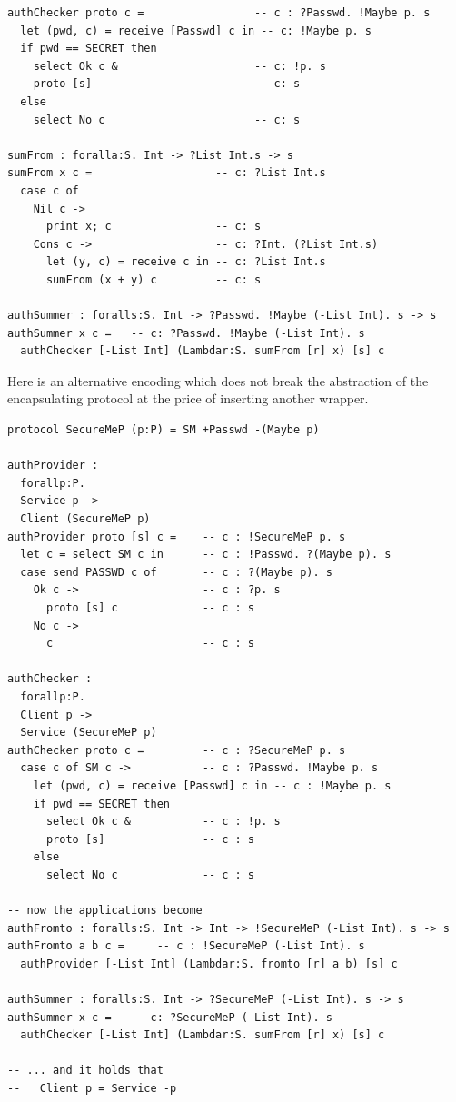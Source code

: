 \begin{lstlisting}
authChecker proto c =                 -- c : ?Passwd. !Maybe p. s
  let (pwd, c) = receive [Passwd] c in -- c: !Maybe p. s
  if pwd == SECRET then
    select Ok c &                     -- c: !p. s
    proto [s]                         -- c: s
  else
    select No c                       -- c: s

sumFrom : foralla:S. Int -> ?List Int.s -> s
sumFrom x c =                   -- c: ?List Int.s
  case c of
    Nil c ->                    
      print x; c                -- c: s
    Cons c ->                   -- c: ?Int. (?List Int.s)
      let (y, c) = receive c in -- c: ?List Int.s
      sumFrom (x + y) c         -- c: s

authSummer : foralls:S. Int -> ?Passwd. !Maybe (-List Int). s -> s
authSummer x c =   -- c: ?Passwd. !Maybe (-List Int). s
  authChecker [-List Int] (Lambdar:S. sumFrom [r] x) [s] c
\end{lstlisting}

Here is an alternative encoding which does not break the abstraction
of the encapsulating protocol at the price of inserting another wrapper.
\begin{lstlisting}
protocol SecureMeP (p:P) = SM +Passwd -(Maybe p)

authProvider : 
  forallp:P.
  Service p ->
  Client (SecureMeP p)
authProvider proto [s] c =    -- c : !SecureMeP p. s
  let c = select SM c in      -- c : !Passwd. ?(Maybe p). s
  case send PASSWD c of       -- c : ?(Maybe p). s
    Ok c ->                   -- c : ?p. s
      proto [s] c             -- c : s
    No c ->
      c                       -- c : s

authChecker :
  forallp:P.
  Client p ->
  Service (SecureMeP p)
authChecker proto c =         -- c : ?SecureMeP p. s
  case c of SM c ->           -- c : ?Passwd. !Maybe p. s
    let (pwd, c) = receive [Passwd] c in -- c : !Maybe p. s
    if pwd == SECRET then
      select Ok c &           -- c : !p. s
      proto [s]               -- c : s
    else
      select No c             -- c : s

-- now the applications become
authFromto : foralls:S. Int -> Int -> !SecureMeP (-List Int). s -> s
authFromto a b c =     -- c : !SecureMeP (-List Int). s
  authProvider [-List Int] (Lambdar:S. fromto [r] a b) [s] c

authSummer : foralls:S. Int -> ?SecureMeP (-List Int). s -> s
authSummer x c =   -- c: ?SecureMeP (-List Int). s
  authChecker [-List Int] (Lambdar:S. sumFrom [r] x) [s] c

-- ... and it holds that 
--   Client p = Service -p
\end{lstlisting}


